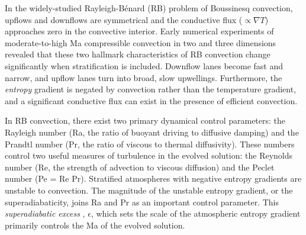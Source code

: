\documentclass[aps, prl, twocolumn, nofootinbib, groupedaddress, amsfonts, amssymb, amsmath]{revtex4-1}
\newcommand{\grad}{\ensuremath{\nabla}}
\newcommand{\RB}{Rayleigh-B\'{e}nard }
\begin{document}

In the widely-studied \RB (RB) problem of Boussinesq convection, 
upflows and downflows are symmetrical and
the conductive flux ($\propto \grad T$) approaches zero in the convective interior.
Early numerical experiments of moderate-to-high Ma compressible convection
in two \cite{graham1975, chan&all1982,
hurlburt&all1984, cattaneo&all1990} and three 
\cite{cattaneo&all1991, brummell&all1996} dimensions
revealed that these two hallmark characteristics of RB convection change
significantly when stratification is included.  Downflow lanes
become fast and narrow, and upflow lanes turn into broad, slow upwellings.
Furthermore, the \emph{entropy} gradient is negated by convection 
rather than the temperature gradient, and
a significant conductive flux can exist in the presence of
efficient convection.

In RB convection, there exist two primary dynamical control parameters: 
the Rayleigh number (Ra, the ratio of
buoyant driving to diffusive damping) and the Prandtl number 
(Pr, the ratio of viscous to thermal
diffusivity). These numbers control two useful
measures of turbulence in the evolved solution:
the Reynolds
number (Re, the strength of advection to viscous diffusion)
and the Peclet number (Pe = Re Pr).  Stratified atmospheres
with negative entropy gradients are unstable to convection.
The magnitude of the unstable entropy gradient, or the superadiabaticity,
joins Ra and Pr as an important control parameter.  This 
\emph{superadiabatic excess} \cite{graham1975}, $\epsilon$, which 
sets the scale of the atmospheric entropy gradient
primarily controls the Ma of the evolved solution.
\end{document}
